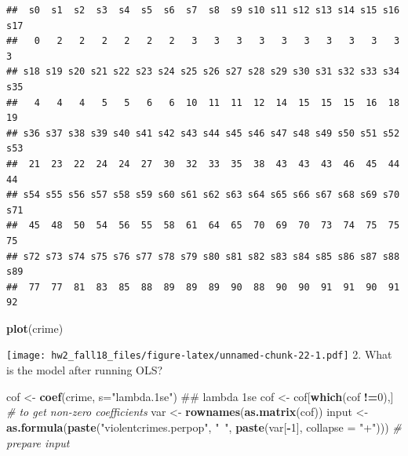 \documentclass[]{article}
\newenvironment{Shaded}{\begin{snugshade}}{\end{snugshade}}
\newcommand{\KeywordTok}[1]{\textcolor[rgb]{0.13,0.29,0.53}{\textbf{#1}}}
\newcommand{\DataTypeTok}[1]{\textcolor[rgb]{0.13,0.29,0.53}{#1}}
\newcommand{\DecValTok}[1]{\textcolor[rgb]{0.00,0.00,0.81}{#1}}
\newcommand{\StringTok}[1]{\textcolor[rgb]{0.31,0.60,0.02}{#1}}
\newcommand{\CommentTok}[1]{\textcolor[rgb]{0.56,0.35,0.01}{\textit{#1}}}
\newcommand{\OperatorTok}[1]{\textcolor[rgb]{0.81,0.36,0.00}{\textbf{#1}}}
\newcommand{\NormalTok}[1]{#1}
\begin{document}
\begin{Shaded}
\end{Shaded}

\begin{verbatim}
##  s0  s1  s2  s3  s4  s5  s6  s7  s8  s9 s10 s11 s12 s13 s14 s15 s16 s17 
##   0   2   2   2   2   2   2   3   3   3   3   3   3   3   3   3   3   3 
## s18 s19 s20 s21 s22 s23 s24 s25 s26 s27 s28 s29 s30 s31 s32 s33 s34 s35 
##   4   4   4   5   5   6   6  10  11  11  12  14  15  15  15  16  18  19 
## s36 s37 s38 s39 s40 s41 s42 s43 s44 s45 s46 s47 s48 s49 s50 s51 s52 s53 
##  21  23  22  24  24  27  30  32  33  35  38  43  43  43  46  45  44  44 
## s54 s55 s56 s57 s58 s59 s60 s61 s62 s63 s64 s65 s66 s67 s68 s69 s70 s71 
##  45  48  50  54  56  55  58  61  64  65  70  69  70  73  74  75  75  75 
## s72 s73 s74 s75 s76 s77 s78 s79 s80 s81 s82 s83 s84 s85 s86 s87 s88 s89 
##  77  77  81  83  85  88  89  89  89  90  88  90  90  91  91  90  91  92
\end{verbatim}

\begin{Shaded}
\begin{Highlighting}[]
\KeywordTok{plot}\NormalTok{(crime)}
\end{Highlighting}
\end{Shaded}

\texttt{[image: hw2\_fall18\_files/figure-latex/unnamed-chunk-22-1.pdf]}
2. What is the model after running OLS?

\begin{Shaded}
\begin{Highlighting}[]
\NormalTok{cof <-}\StringTok{ }\KeywordTok{coef}\NormalTok{(crime, }\DataTypeTok{s=}\StringTok{"lambda.1se"}\NormalTok{) ## lambda 1se}
\NormalTok{cof <-}\StringTok{ }\NormalTok{cof[}\KeywordTok{which}\NormalTok{(cof }\OperatorTok{!=}\DecValTok{0}\NormalTok{),] }\CommentTok{# to get  non-zero coefficients }
\NormalTok{var <-}\StringTok{ }\KeywordTok{rownames}\NormalTok{(}\KeywordTok{as.matrix}\NormalTok{(cof)) }
\NormalTok{input <-}\StringTok{ }\KeywordTok{as.formula}\NormalTok{(}\KeywordTok{paste}\NormalTok{(}\StringTok{"violentcrimes.perpop"}\NormalTok{, }\StringTok{"~"}\NormalTok{, }\KeywordTok{paste}\NormalTok{(var[}\OperatorTok{-}\DecValTok{1}\NormalTok{], }\DataTypeTok{collapse =} \StringTok{"+"}\NormalTok{))) }\CommentTok{# prepare input}
\end{Highlighting}
\end{Shaded}
\end{document}
